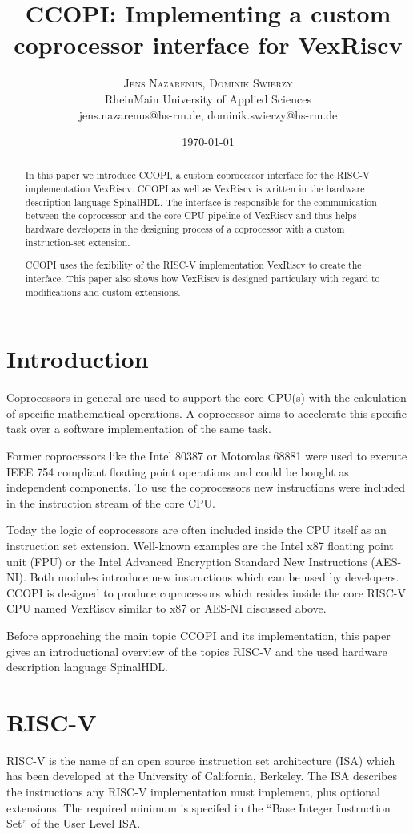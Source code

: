 \documentclass[twoside,twocolumn]{article}
\title{\vspace{-7mm}%
	\fontsize{24pt}{10pt}\selectfont
	\textbf{CCOPI: Implementing a custom coprocessor interface for
    VexRiscv}
	}
\author{%
	\large
	\textsc{Jens Nazarenus, Dominik Swierzy} \\[2mm]
	\normalsize	RheinMain University of Applied Sciences \\
    \normalsize	jens.nazarenus@hs-rm.de, dominik.swierzy@hs-rm.de
	}
\date{\today}
\begin{document}
\maketitle

\begin{abstract}
\noindent In this paper we introduce CCOPI, a custom coprocessor interface for the
RISC-V implementation VexRiscv. CCOPI as well as VexRiscv is written in
the hardware description language SpinalHDL. The interface is responsible 
for the communication between the coprocessor and the core CPU pipeline of 
VexRiscv and thus helps hardware developers in the designing process of 
a coprocessor with a custom instruction-set extension.

CCOPI uses the fexibility of the RISC-V implementation VexRiscv to create 
the interface. This paper also shows how VexRiscv is designed particulary with 
regard to modifications and custom extensions. 
\end{abstract}

\section{Introduction}
Coprocessors in general are used to support the core CPU(s) with the
calculation of specific mathematical operations. A coprocessor aims to
accelerate this specific task over a software implementation of the same
task.

Former coprocessors like the Intel 80387 or Motorolas 68881 were used to
execute IEEE 754 compliant floating point operations and could be
bought as independent components. To use the coprocessors new
instructions were included in the instruction stream of the core CPU.

Today the logic of coprocessors are often included inside the CPU
itself as an instruction set extension. Well-known examples are the
Intel\textregistered{} x87 
floating point unit (FPU) or the Intel\textregistered{} Advanced Encryption Standard New 
Instructions (AES-NI). Both modules introduce new instructions which can
be used by developers.
CCOPI is designed to produce coprocessors which resides inside the core
RISC-V CPU named VexRiscv similar to x87 or AES-NI discussed above.

Before approaching the main topic CCOPI and its implementation, this paper
gives an introductional overview of the topics RISC-V and the used
hardware description language SpinalHDL.
\section{RISC-V}
RISC-V is the name of an open source instruction set architecture (ISA)
which has been developed at the University of California, Berkeley.
The ISA describes the instructions any RISC-V implementation must
implement, plus optional extensions. The required minimum is specifed in
the ``Base Integer Instruction Set'' of the User Level ISA.
\end{document}
